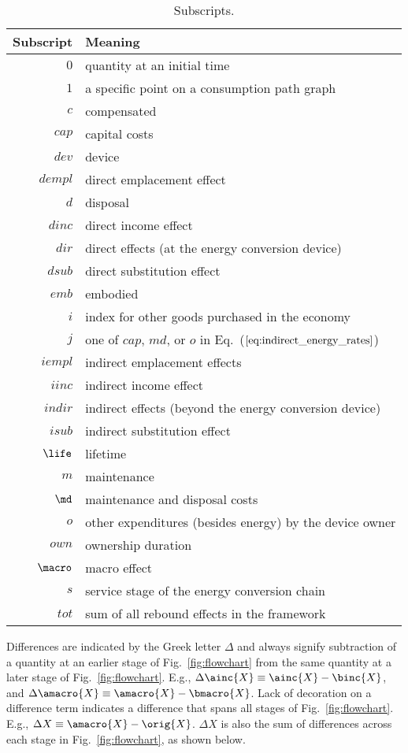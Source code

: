 \begin{table}
\centering
\caption{Subscripts.}
\begin{tabular}{r l}
  \toprule
  Subscript & Meaning \\
  \midrule
  $0$ & quantity at an initial time \\
  $1$ & a specific point on a consumption path graph \\
  $c$ & compensated \\
  $cap$ & capital costs \\
  $dev$ & device \\
  $dempl$ & direct emplacement effect \\
  $d$ & disposal \\
  $dinc$ & direct income effect \\
  $dir$ & direct effects (at the energy conversion device) \\
  $dsub$ & direct substitution effect \\
  $emb$ & embodied \\
  $i$ & index for other goods purchased in the economy \\
  $j$ & one of $cap$, $md$, or $o$ in Eq.~($\ref{eq:indirect_energy_rates}$) \\
  $iempl$ & indirect emplacement effects \\
  $iinc$ & indirect income effect \\
  $indir$ & indirect effects (beyond the energy conversion device) \\
  $isub$ & indirect substitution effect \\
  $\life$ & lifetime \\
  $m$ & maintenance \\
  $\md$ & maintenance and disposal costs \\
  $o$ & other expenditures (besides energy) by the device owner \\
  $own$ & ownership duration \\
  $\macro$ & macro effect \\
  $s$ & service stage of the energy conversion chain \\
  $tot$ & sum of all rebound effects in the framework \\
  \bottomrule
\end{tabular}
\label{tab:subscripts}
\end{table}


Differences are indicated by the Greek letter $\Delta$ and always
signify subtraction of a quantity at an earlier stage of Fig.~\ref{fig:flowchart}
from the same quantity at a later stage of Fig.~\ref{fig:flowchart}.
E.g.,
$\Delta \ainc{X} \equiv \ainc{X} - \binc{X}$, and
$\Delta \amacro{X} \equiv \amacro{X} - \bmacro{X}$.
Lack of decoration on a difference term indicates a difference that spans all stages of Fig.~\ref{fig:flowchart}.
E.g., $\Delta X \equiv \amacro{X} - \orig{X}$.
$\Delta X$ is also the sum of differences across each stage in Fig.~\ref{fig:flowchart},
as shown below.


